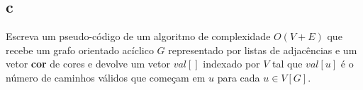 \subsection{c} Escreva um pseudo-código de um algoritmo de complexidade $O(V +E)$ que recebe um grafo orientado acíclico $G$ representado por listas de adjacências e um vetor \textbf{cor} de cores e devolve um vetor $val[]$ indexado por $V$ tal que $val[u]$ é o número de caminhos válidos que começam em $u$ para cada $u \in V[G]$.

\itemdsep[0.25]
